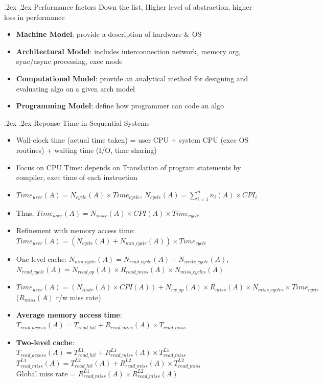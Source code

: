 \documentclass[10pt,landscape,a4paper]{article}
\makeatletter
\renewcommand{\subsection}{\@startsection{subsection}{1}{0mm}%
  {.2ex}%
  {.2ex}%
{\sffamily\bfseries}}
\renewcommand{\subsubsection}{\@startsection{subsubsection}{1}{0mm}%
  {.2ex}%
  {.2ex}%
{\rmfamily\bfseries}}
\makeatother
\begin{document}
\begin{multicols*}{4}
  \subsection{Performance factors}
  Down the list, Higher level of abstraction, higher loss in performance
  \begin{itemize}
    \item \textbf{Machine Model}: provide a description of hardware \& OS
    \item \textbf{Architectural Model}: includes interconnection network, memory org, sync/async processing, exec mode
    \item \textbf{Computational Model}: provide an analytical method for designing and evaluating algo on a given arch model
    \item \textbf{Programming Model}: define how programmer can code an algo
  \end{itemize}
  \subsubsection{Reponse Time in Sequential Systems}
  \begin{itemize}
    \item Wall-clock time (actual time taken) = user CPU + system CPU (exec OS routines) + waiting time (I/O, time sharing)
    \item Focus on CPU Time: depends on Translation of program statements by compiler, exec time of each instruction
    \item $Time_{user}(A) = N_{cycle}(A) \times Time_{cycle}$, $N_{cycle}(A) = \sum\limits_{i = 1}^{n} n_i(A)\times CPI_i$
    \item Thus, $Time_{user}(A) = N_{instr}(A)\times CPI(A) \times Time_{cycle}$
    \item Refinement with memory access time:\\
          $Time_{user}(A) = (N_{cycle}(A) + N_{mm\_cycle}(A)) \times Time_{cycle}$
    \item One-level cache: $N_{mm\_cycle}(A) = N_{read\_cycle}(A) + N_{write\_cycle}(A)$, $N_{read\_cycle}(A) = N_{read\_op}(A)\times R_{read\_miss}(A) \times N_{miss\_cycles}(A)$
    \item $Time_{user}(A) = (N_{instr}(A)\times CPI(A)) + N_{rw\_op}(A)\times R_{miss}(A) \times N_{miss\_cycles} \times Time_{cycle}$ ($R_{miss}(A)$ r/w miss rate)
    \item \textbf{Average memory access time}:\\
          $T_{read\_access}(A) = T_{read\_hit} + R_{read\_miss}(A) \times T_{read\_miss}$
    \item \textbf{Two-level cache}:\\
          $T_{read\_access}(A) = T^{L1}_{read\_hit} + R^{L1}_{read\_miss}(A) \times T^{L1}_{read\_miss}$\\
          $T^{L1}_{read\_miss}(A)= T^{L2}_{read\_hit}(A) + R^{L2}_{read\_miss}(A) \times T^{L2}_{read\_miss}$\\
          Global miss rate = $R^{L1}_{read\_miss}(A) \times R^{L2}_{read\_miss}(A)$
  \end{itemize}

\end{multicols*}
\end{document}

